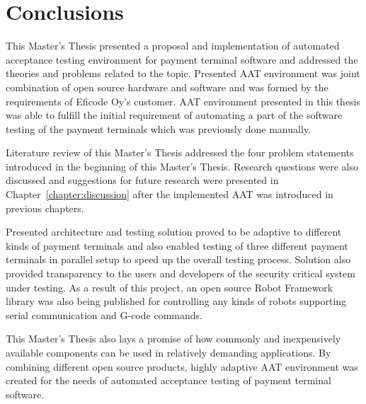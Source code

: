 
\chapter{Conclusions}
\label{chapter:conclusions}

This Master's Thesis presented a proposal and implementation of automated acceptance testing environment for payment terminal software and addressed the theories and problems related to the topic. Presented AAT environment was joint combination of open source hardware and software and was formed by the requirements of Eficode Oy's customer. AAT environment presented in this thesis was able to fulfill the initial requirement of automating a part of the software testing of the payment terminals which was previously done manually.

Literature review of this Master's Thesis addressed the four problem statements introduced in the beginning of this Master's Thesis. Research questions were also discussed and suggestions for future research were presented in Chapter~\ref{chapter:discussion} after the implemented AAT was introduced in previous chapters.

Presented architecture and testing solution proved to be adaptive to different kinds of payment terminals and also enabled testing of three different payment terminals in parallel setup to speed up the overall testing process. Solution also provided transparency to the users and developers of the security critical system under testing. As a result of this project, an open source Robot Framework library was also being published for controlling any kinds of robots supporting serial communication and G-code commands.

This Master's Thesis also lays a promise of how commonly and inexpensively available components can be used in relatively demanding applications. By combining different open source products, highly adaptive AAT environment was created for the needs of automated acceptance testing of payment terminal software.